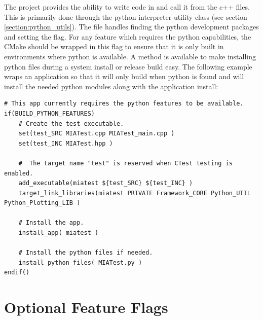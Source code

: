 The  project provides the ability to write code in  and call it from the c++ files. This is primarily done through the python interpreter utility class (see section \ref{section:python_utils}). The  file handles finding the python development packages and setting the  flag. For any feature which requires the python capabilities, the CMake should be wrapped in this flag to ensure that it is only built in environments where python is available. A  method is available to make installing python files during a system install or release build easy. The following example wraps an application so that it will only build when python is found and will install the needed python modules along with the application install:
\begin{lstlisting}[style=makestyle]
# This app currently requires the python features to be available.
if(BUILD_PYTHON_FEATURES)
	# Create the test executable.
	set(test_SRC MIATest.cpp MIATest_main.cpp )
	set(test_INC MIATest.hpp )

	#  The target name "test" is reserved when CTest testing is enabled.
	add_executable(miatest ${test_SRC} ${test_INC} )
	target_link_libraries(miatest PRIVATE Framework_CORE Python_UTIL Python_Plotting_LIB )

	# Install the app.
	install_app( miatest )

	# Install the python files if needed.
	install_python_files( MIATest.py )
endif()
\end{lstlisting}







\section{Optional Feature Flags}\label{section:optional_features}

